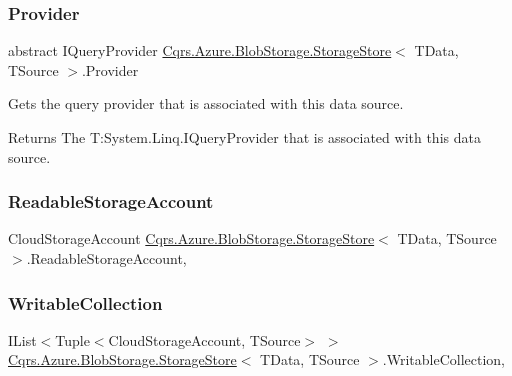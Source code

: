 \subsubsection{\texorpdfstring{Provider}{Provider}}
{\footnotesize\ttfamily abstract I\+Query\+Provider \hyperlink{classCqrs_1_1Azure_1_1BlobStorage_1_1StorageStore}{Cqrs.\+Azure.\+Blob\+Storage.\+Storage\+Store}$<$ T\+Data, T\+Source $>$.Provider\hspace{0.3cm}{\ttfamily [get]}}



Gets the query provider that is associated with this data source. 

\begin{DoxyReturn}{Returns}
The T\+:\+System.\+Linq.\+I\+Query\+Provider that is associated with this data source. 
\end{DoxyReturn}
\mbox{\label{classCqrs_1_1Azure_1_1BlobStorage_1_1StorageStore_af0e0bcba6758fda015f51b07eb464b14_af0e0bcba6758fda015f51b07eb464b14}} 
\subsubsection{\texorpdfstring{Readable\+Storage\+Account}{ReadableStorageAccount}}
{\footnotesize\ttfamily Cloud\+Storage\+Account \hyperlink{classCqrs_1_1Azure_1_1BlobStorage_1_1StorageStore}{Cqrs.\+Azure.\+Blob\+Storage.\+Storage\+Store}$<$ T\+Data, T\+Source $>$.Readable\+Storage\+Account\hspace{0.3cm}{\ttfamily [get]}, {\ttfamily [protected]}}

\mbox{\label{classCqrs_1_1Azure_1_1BlobStorage_1_1StorageStore_aece11e874587ca60913d275079dfc13c_aece11e874587ca60913d275079dfc13c}} 
\subsubsection{\texorpdfstring{Writable\+Collection}{WritableCollection}}
{\footnotesize\ttfamily I\+List$<$Tuple$<$Cloud\+Storage\+Account, T\+Source$>$ $>$ \hyperlink{classCqrs_1_1Azure_1_1BlobStorage_1_1StorageStore}{Cqrs.\+Azure.\+Blob\+Storage.\+Storage\+Store}$<$ T\+Data, T\+Source $>$.Writable\+Collection\hspace{0.3cm}{\ttfamily [get]}, {\ttfamily [protected]}}


